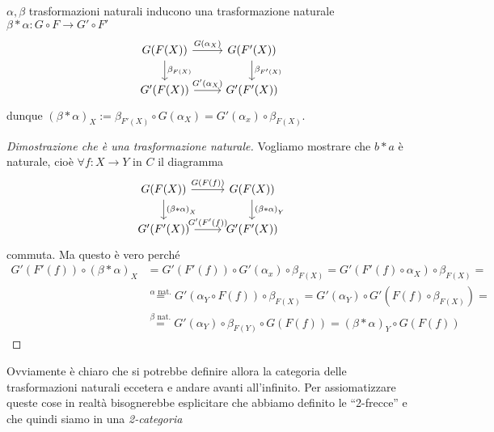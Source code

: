 \begin{proposition}{}
\(\alpha, \beta\) trasformazioni naturali inducono una trasformazione naturale
\(\beta * \alpha : G \circ F \to G' \circ F'\) 
\[\begin{tikzcd}
	{G{(F{(X)})}} & {G{(F'{(X)})}} \\
    {G'{(F{(X)})}} & {G'{(F'{(X)})}}
	\arrow["G{(\alpha_X)}", from=1-1, to=1-2]
	\arrow["\beta_{F{(X)}}  ", from=1-1, to=2-1]
	\arrow["\beta_{F'{(X)}} ", from=1-2, to=2-2]
	\arrow["G'{(\alpha_X)}", from=2-1, to=2-2]
\end{tikzcd}\]
dunque \((\beta * \alpha)_X := \beta_{F'{(X)}} \circ G{(\alpha_X)} = G'{(\alpha_x)} \circ \beta_{F{(X)}} \).
\end{proposition}
\begin{proof}[Dimostrazione che è una trasformazione naturale]
Vogliamo mostrare che \(b * a\) è naturale, cioè \(\forall f : X \to Y\) in \(C\) il diagramma
\[\begin{tikzcd}
	{G{(F{(X)})}} & {G{(F{(X)})}} \\
    {G'{(F'{(X)})}} & {G'{(F'{(X)})}}
	\arrow["G{(F{(f)})}", from=1-1, to=1-2]
	\arrow["{(\beta * \alpha)}_X", from=1-1, to=2-1]
	\arrow["{(\beta * \alpha)}_Y", from=1-2, to=2-2]
	\arrow["G'{(F'{(f)})}", from=2-1, to=2-2]
\end{tikzcd}\]
commuta. Ma questo è vero perché
\begin{align*}
    G'{(F'{(f)})} \circ {(\beta * \alpha)}_X &= G'{(F'{(f)})} \circ G'{(\alpha_x)}
  \circ \beta_{F{(X)}} = G'{(F'{(f)} \circ \alpha_X)} \circ \beta_{F{(X)}} = \\
    &\overset{\alpha \text{ nat.}}{=} G'{(\alpha_Y \circ F{(f)})} \circ
    \beta_{F{(X)}} = G'{(\alpha_Y)} \circ G'{(F{(f)} \circ \beta_{F{(X)}})} = \\
    &\overset{\beta \text{ nat.}}{=} G'{(\alpha_Y)} \circ \beta_{F{(Y)}}
    \circ G{(F{(f)})} = {(\beta * \alpha)}_Y \circ G{(F{(f)})}
\end{align*}
\end{proof}

Ovviamente è chiaro che si potrebbe definire allora la categoria delle
trasformazioni naturali eccetera e andare avanti all'infinito. Per
assiomatizzare queste cose in realtà bisognerebbe esplicitare che abbiamo
definito le ``2-frecce'' e che quindi siamo in una \emph{2-categoria}

